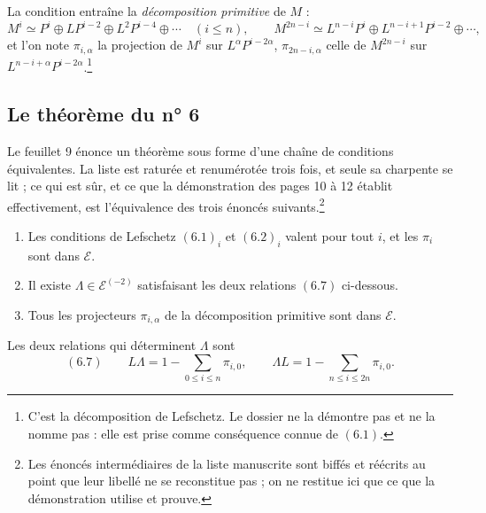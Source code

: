 \documentclass[11pt,a4paper]{article}
\begin{document}
La condition entraîne la \emph{décomposition primitive} de $M$ :
\[
M^{i} \simeq P^{i} \oplus L P^{i-2} \oplus L^{2}P^{i-4} \oplus \cdots
\quad (i \leqslant n),
\qquad
M^{2n-i} \simeq L^{n-i}P^{i} \oplus L^{n-i+1}P^{i-2} \oplus \cdots,
\]
et l'on note $\pi_{i,\alpha}$ la projection de $M^{i}$ sur
$L^{\alpha}P^{i-2\alpha}$, $\pi_{2n-i,\alpha}$ celle de $M^{2n-i}$ sur
$L^{n-i+\alpha}P^{i-2\alpha}$.\footnote{C'est la décomposition de Lefschetz.
Le dossier ne la démontre pas et ne la nomme pas : elle est prise comme
conséquence connue de $(6.1)$.}

\subsection*{Le théorème du n° 6}

Le feuillet 9 énonce un théorème sous forme d'une chaîne de conditions
équivalentes. La liste est raturée et renumérotée trois fois, et seule sa
charpente se lit ; ce qui est sûr, et ce que la démonstration des pages 10 à
12 établit effectivement, est l'équivalence des trois énoncés
suivants.\footnote{Les énoncés intermédiaires de la liste manuscrite sont
biffés et réécrits au point que leur libellé ne se reconstitue pas ; on ne
restitue ici que ce que la démonstration utilise et prouve.}

\begin{enumerate}
  \item Les conditions de Lefschetz $(6.1)_{i}$ et $(6.2)_{i}$ valent pour tout
  $i$, et les $\pi_{i}$ sont dans $\mathcal{E}$.
  \item Il existe $\Lambda \in \mathcal{E}^{(-2)}$ satisfaisant les deux
  relations $(6.7)$ ci-dessous.
  \item Tous les projecteurs $\pi_{i,\alpha}$ de la décomposition primitive
  sont dans $\mathcal{E}$.
\end{enumerate}

Les deux relations qui déterminent $\Lambda$ sont
\[
(6.7) \qquad
L\Lambda = 1 - \sum_{0 \leqslant i \leqslant n} \pi_{i,0},
\qquad
\Lambda L = 1 - \sum_{n \leqslant i \leqslant 2n} \pi_{i,0} .
\]
\end{document}
